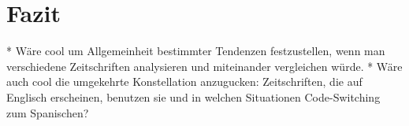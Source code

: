 \section{Fazit}

\begin{comment}
    * Einleitung und Fazit müssen zusammenpassen.
    * sind die Erkenntnisse im Fazit aus der Arbeit ableitbar?
    * Vorgehensweise zusammenfassen

Kritische Zusammenfassung
\begin{itemize}
    \item was war in den Texten nicht so gelungen?
    \item welche Fragen sind offen geblieben?
    \item in welche Richtung kann noch weiter geforscht werden?
    \item was sind gegnerische Meinungen zum Thema?
\end{itemize}
\end{comment}



* Wäre cool um Allgemeinheit bestimmter Tendenzen festzustellen, wenn man verschiedene Zeitschriften analysieren und miteinander vergleichen würde.
* Wäre auch cool die umgekehrte Konstellation anzugucken: Zeitschriften, die auf Englisch erscheinen, benutzen sie und in welchen Situationen Code-Switching zum Spanischen?
